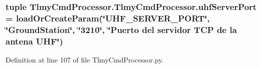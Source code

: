 \hypertarget{namespace_tlmy_cmd_processor_1_1_tlmy_cmd_processor_abc4f5193ae5293a175c24785f648c36f}{}
\subsubsection[{uhf\+Server\+Port}]{\setlength{\rightskip}{0pt plus 5cm}tuple Tlmy\+Cmd\+Processor.\+Tlmy\+Cmd\+Processor.\+uhf\+Server\+Port = load\+Or\+Create\+Param(\char`\"{}U\+H\+F\+\_\+\+S\+E\+R\+V\+E\+R\+\_\+\+P\+O\+R\+T\char`\"{}, \char`\"{}Ground\+Station\char`\"{}, \char`\"{}3210\char`\"{}, \char`\"{}Puerto del servidor T\+C\+P de la antena U\+H\+F\char`\"{})}\label{namespace_tlmy_cmd_processor_1_1_tlmy_cmd_processor_abc4f5193ae5293a175c24785f648c36f}


Definition at line 107 of file Tlmy\+Cmd\+Processor.\+py.


